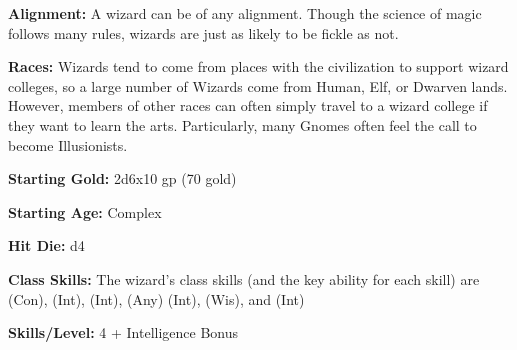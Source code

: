 
\textbf{Alignment:} A wizard can be of any alignment. Though the science of magic follows many rules, wizards are just as likely to be fickle as not.

\textbf{Races:} Wizards tend to come from places with the civilization to support wizard colleges, so a large number of Wizards come from Human, Elf, or Dwarven lands. However, members of other races can often simply travel to a wizard college if they want to learn the arts. Particularly, many Gnomes often feel the call to become Illusionists.

\textbf{Starting Gold:} 2d6x10 gp (70 gold)

\textbf{Starting Age:} Complex

\textbf{Hit Die:} d4

\textbf{Class Skills:} The wizard's class skills (and the key ability for each skill) are  (Con),  (Int),  (Int),  (Any) (Int),  (Wis), and  (Int)

\textbf{Skills/Level:} 4 + Intelligence Bonus

\poorbab{}
\poorfor{}
\poorref{}
\goodwil{}

\begin{fullcastingclasstable}
\end{fullcastingclasstable}

